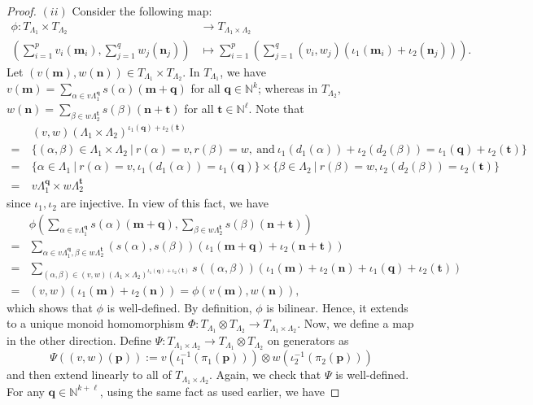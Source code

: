 \documentclass[10pt,a4paper]{amsart}
\newcommand{\M}{\mathbf{m}}
\newcommand{\N}{\mathbf{n}}
\begin{document}
\begin{proof}
$(ii)$ Consider the following map: 
\begin{align*}
\phi:T_{\Lambda_1}\times T_{\Lambda_2}&\longrightarrow T_{\Lambda_1\times \Lambda_2}\\
\left(\displaystyle{\sum_{i=1}^{p}} v_i(\M_i),\displaystyle{\sum_{j=1}^{q}} w_j(\N_j)\right)&\longmapsto \displaystyle{\sum_{i=1}^{p}}\left(\displaystyle{\sum_{j=1}^{q}} (v_i,w_j)(\iota_1(\M_i)+\iota_2(\N_j))\right).
\end{align*}
Let $(v(\M),w(\N))\in T_{\Lambda_1}\times T_{\Lambda_2}$. In $T_{\Lambda_1}$, we have $v(\M)=\displaystyle{\sum_{\alpha\in v\Lambda_1^{\mathbf{q}}}} s(\alpha)(\M+\mathbf{q})$ for all $\mathbf{q}\in \mathbb{N}^k$; whereas in $T_{\Lambda_2}$, $w(\N)=\displaystyle{\sum_{\beta\in w\Lambda_2^{\mathbf{t}}}} s(\beta)(\N+\mathbf{t})$ for all $\mathbf{t}\in \mathbb{N}^\ell$. Note that 
\begin{align*}
&~(v,w)(\Lambda_1\times \Lambda_2)^{\iota_1(\mathbf{q})+\iota_2(\mathbf{t})}\\
=&~\{(\alpha,\beta)\in \Lambda_1\times \Lambda_2~|~r(\alpha)=v,r(\beta)=w,~\text{and}~\iota_1(d_1(\alpha))+\iota_2(d_2(\beta))=\iota_1(\mathbf{q})+\iota_2(\mathbf{t})\}\\
=&~\{\alpha\in \Lambda_1~|~r(\alpha)=v,\iota_1(d_1(\alpha))=\iota_1(\mathbf{q})\}\times \{\beta\in \Lambda_2~|~r(\beta)=w,\iota_2(d_2(\beta))=\iota_2(\mathbf{t})\}\\
=&~v\Lambda_1^{\mathbf{q}}\times w\Lambda_2^{\mathbf{t}}
\end{align*} since $\iota_1,\iota_2$ are injective. In view of this fact, we have 
\begin{align*}
&\phi\left(\displaystyle{\sum_{\alpha\in v\Lambda_1^{\mathbf{q}}}} s(\alpha)(\M+\mathbf{q}),\displaystyle{\sum_{\beta\in w\Lambda_2^{\mathbf{t}}}} s(\beta)(\N+\mathbf{t})\right)\\
=&\displaystyle{\sum_{\alpha\in v\Lambda_1^{\mathbf{q}},\beta\in w\Lambda_2^{\mathbf{t}}}} (s(\alpha),s(\beta))(\iota_1(\M+\mathbf{q})+\iota_2(\N+\mathbf{t}))\\
=&\displaystyle{\sum_{(\alpha,\beta)\in (v,w)(\Lambda_1\times \Lambda_2)^{\iota_1(\mathbf{q})+\iota_2(\mathbf{t})}}} s((\alpha,\beta))(\iota_1(\M)+\iota_2(\N)+\iota_1(\mathbf{q})+\iota_2(\mathbf{t}))\\
=&(v,w)(\iota_1(\M)+\iota_2(\N))=\phi(v(\M),w(\N)), 
\end{align*}
which shows that $\phi$ is well-defined. By definition, $\phi$ is bilinear. Hence, it extends to a unique monoid homomorphism $\Phi:T_{\Lambda_1}\otimes T_{\Lambda_2}\longrightarrow T_{\Lambda_1\times \Lambda_2}$. Now, we define a map in the other direction. Define $\Psi:T_{\Lambda_1\times \Lambda_2}\longrightarrow T_{\Lambda_1}\otimes T_{\Lambda_2}$ on generators as \[\Psi((v,w)(\mathbf{p})):=v(\iota_1^{-1}(\pi_1(\mathbf{p})))\otimes w(\iota_2^{-1}(\pi_2(\mathbf{p})))\] and then extend linearly to all of $T_{\Lambda_1\times \Lambda_2}$. Again, we check that $\Psi$ is well-defined. For any $\mathbf{q}\in \mathbb{N}^{k+\ell}$, using the same fact as used earlier, we have

\end{proof}
\end{document}
